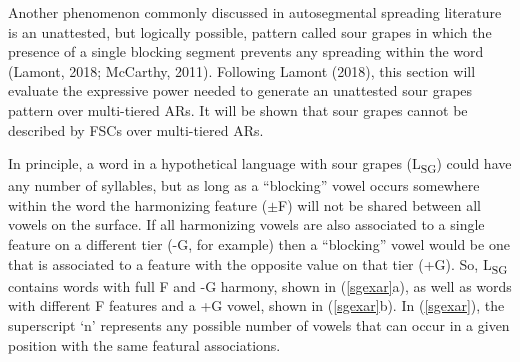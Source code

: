 \documentclass[,doc,floatsintext]{apa6}
\theoremstyle{definition}
\theoremstyle{definition}
\theoremstyle{definition}
\theoremstyle{remark}
\begin{document}
Another phenomenon commonly discussed in autosegmental spreading
literature is an unattested, but logically possible, pattern called sour
grapes in which the presence of a single blocking segment prevents any
spreading within the word (Lamont, 2018; McCarthy, 2011). Following
Lamont (2018), this section will evaluate the expressive power needed to
generate an unattested sour grapes pattern over multi-tiered ARs. It
will be shown that sour grapes cannot be described by FSCs over
multi-tiered ARs.

In principle, a word in a hypothetical language with sour grapes
(L\textsubscript{SG}) could have any number of syllables, but as long as
a \enquote{blocking} vowel occurs somewhere within the word the
harmonizing feature (\(\pm\)F) will not be shared between all vowels on
the surface. If all harmonizing vowels are also associated to a single
feature on a different tier (-G, for example) then a \enquote{blocking}
vowel would be one that is associated to a feature with the opposite
value on that tier (+G). So, L\textsubscript{SG} contains words with
full F and -G harmony, shown in (\ref{sgexar}a), as well as words with
different F features and a +G vowel, shown in (\ref{sgexar}b). In
(\ref{sgexar}), the superscript `n' represents any possible number of
vowels that can occur in a given position with the same featural
associations.

\begin{exe}
\label{sgexar} \\
\end{exe}
\end{document}
